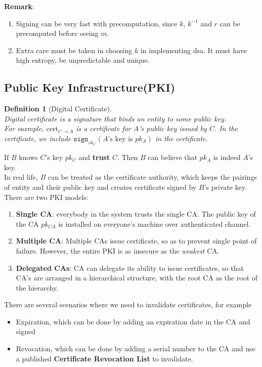 \documentclass[12pt]{article}
\newtheorem{definition}{Definition}[section]
\theoremstyle{definition}
\begin{document}
\textbf{Remark}: 
\begin{enumerate}
  \item Signing can be very fast with precomputation, since $k$, $k^{-1}$ and $r$ can be precomputed before seeing $m$.
  \item Extra care must be taken in choosing $k$ in implementing dsa. It must have high entropy, be unpredictable and unique.
\end{enumerate}
\subsection{Public Key Infrastructure(PKI)}
\begin{definition}[Digital Certificate]
\hfill\\\normalfont Digital certificate is a signature that binds an entity to some public key.\\
For eaxmple, $\text{cert}_{C\to A}$ is a certificate for $A$'s public key issued by $C$. In the certificate, we include $\texttt{sign}_{sk_C}(A\text{'s key is }pk_A)$ in the certificate.
\end{definition}
If $B$ knows $C$'s key $pk_C$ and \textbf{trust} $C$. Then $B$ can believe that $pk_A$ is indeed $A$'s key.\\
In real life, $B$ can be treated as the certificate authority, which keeps the pairings of entity and their public key and creates certificate signed by $B$'s private key.\\
There are two PKI models:
\begin{enumerate}
  \item \textbf{Single CA}: everybody in the system trusts the single CA. The public key of the CA $pk_{CA}$ is installed on everyone's machine over authenticated channel.
  \item \textbf{Multiple CA}: Multiple CAs issue certificate, so as to prevent single point of failure. However, the entire PKI is as insecure as the \textit{weakest} CA.
  \item \textbf{Delegated CAs}: CA can delegate its ability to issue certificates, so that CA's are arranged in a hierarchical structure, with the root CA as the root of the hierarchy.
\end{enumerate}
There are several scenarios where we need to invalidate certificates, for example
\begin{itemize}
  \item Expiration, which can be done by adding an expiration date in the CA and signed
  \item Revocation, which can be done by adding a serial number to the CA and use a published \textbf{Certificate Revocation List} to invalidate.
\end{itemize}
\end{document}
